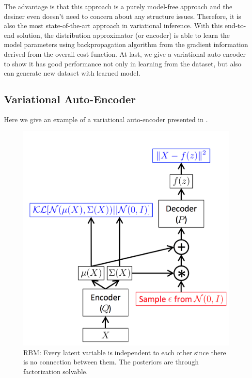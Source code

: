 \documentclass[conference]{IEEEtran}
\begin{document}
The advantage is that this approach is a purely model-free approach and the desiner even doesn't need to concern about any structure issues. Therefore, it is also the most state-of-the-art approach in variational inference. With this end-to-end solution, the distribution approximator (or encoder) is able to learn the model parameters using backpropagation algorithm from the gradient information derived from the overall cost function. At last, we give a variational auto-encoder to show it has good performance not only in learning from the dataset, but also can generate new dataset with learned model.
\subsection{Variational Auto-Encoder}
Here we give an example of a variational auto-encoder presented in \cite{kingma2013auto}.
\begin{figure}[ht]
  \centering
  \includegraphics[scale=0.4]{picture3.png}
     \caption{RBM: Every latent variable is independent to each other since there is no connection between them. The posteriors are through factorization solvable.}\label{pic_3}
\end{figure}
\end{document}
